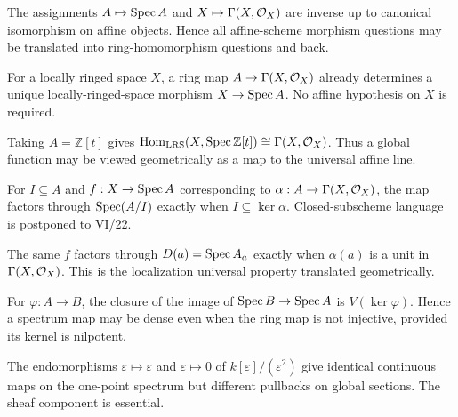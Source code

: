 \begin{example}
The assignments $A\mapsto\operatorname{Spec} A$ and $X\mapsto\Gamma(X,\mathcal O_X)$ are inverse up to canonical isomorphism on affine objects.  Hence all affine-scheme morphism questions may be translated into ring-homomorphism questions and back.
\end{example}

\begin{example}
For a locally ringed space $X$, a ring map $A\to\Gamma(X,\mathcal O_X)$ already determines a unique locally-ringed-space morphism $X\to\operatorname{Spec} A$.  No affine hypothesis on $X$ is required.
\end{example}

\begin{example}
Taking $A=\mathbb Z[t]$ gives $\operatorname{Hom}_{\mathrm{LRS}}(X,\operatorname{Spec}\mathbb Z[t])\cong\Gamma(X,\mathcal O_X)$.  Thus a global function may be viewed geometrically as a map to the universal affine line.
\end{example}

\begin{example}
For $I\subseteq A$ and $f:X\to\operatorname{Spec} A$ corresponding to $\alpha:A\to\Gamma(X,\mathcal O_X)$, the map factors through $\operatorname{Spec}(A/I)$ exactly when $I\subseteq\ker\alpha$.  Closed-subscheme language is postponed to VI/22.
\end{example}

\begin{example}
The same $f$ factors through $D(a)=\operatorname{Spec} A_a$ exactly when $\alpha(a)$ is a unit in $\Gamma(X,\mathcal O_X)$.  This is the localization universal property translated geometrically.
\end{example}

\begin{example}
For $\varphi:A\to B$, the closure of the image of $\operatorname{Spec} B\to\operatorname{Spec} A$ is $V(\ker\varphi)$.  Hence a spectrum map may be dense even when the ring map is not injective, provided its kernel is nilpotent.
\end{example}

\begin{example}
The endomorphisms $\varepsilon\mapsto\varepsilon$ and $\varepsilon\mapsto0$ of $k[\varepsilon]/(\varepsilon^2)$ give identical continuous maps on the one-point spectrum but different pullbacks on global sections.  The sheaf component is essential.
\end{example}

